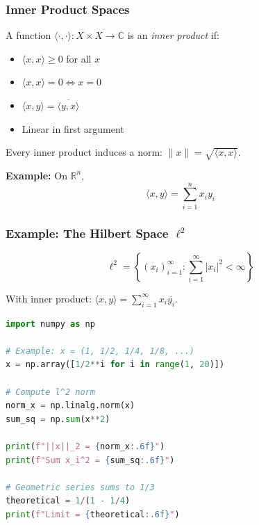 \documentclass[aspectratio=169,10pt]{beamer}
\begin{document}
\begin{frame}
\frametitle{Inner Product Spaces}

\begin{definition}
A function $\langle \cdot, \cdot \rangle: X \times X \to \mathbb{C}$ is an \emph{inner product} if:
\begin{itemize}
\item[\textbf{IP1}] $\langle x, x \rangle \geq 0$ for all $x$
\item[\textbf{IP2}] $\langle x, x \rangle = 0 \iff x = 0$
\item[\textbf{IP3}] $\langle x, y \rangle = \overline{\langle y, x \rangle}$
\item[\textbf{IP4}] Linear in first argument
\end{itemize}
\end{definition}

Every inner product induces a norm: $\|x\| = \sqrt{\langle x, x \rangle}$.

\vspace{0.3cm}

\textbf{Example:} On $\mathbb{R}^n$,
$$\langle x, y \rangle = \sum_{i=1}^n x_i y_i$$
\end{frame}

\begin{frame}[fragile]
\frametitle{Example: The Hilbert Space $\ell^2$}

\begin{definition}
$$\ell^2 = \left\{(x_i)_{i=1}^\infty : \sum_{i=1}^\infty |x_i|^2 < \infty\right\}$$
\end{definition}

With inner product: $\langle x, y \rangle = \sum_{i=1}^\infty x_i \overline{y_i}$.

\vspace{0.3cm}

\begin{lstlisting}[language=Python]
import numpy as np

# Example: x = (1, 1/2, 1/4, 1/8, ...)
x = np.array([1/2**i for i in range(1, 20)])

# Compute l^2 norm
norm_x = np.linalg.norm(x)
sum_sq = np.sum(x**2)

print(f"||x||_2 = {norm_x:.6f}")
print(f"Sum x_i^2 = {sum_sq:.6f}")

# Geometric series sums to 1/3
theoretical = 1/(1 - 1/4)
print(f"Limit = {theoretical:.6f}")
\end{lstlisting}
\end{frame}
\end{document}
